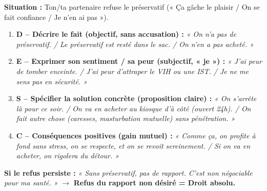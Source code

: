 \documentclass[11pt]{article}
\begin{document}
\begin{methode}
\textbf{Situation :} Ton/ta partenaire refuse le préservatif (« Ça gâche le plaisir / On se fait confiance / Je n'en ai pas »).
\begin{enumerate}
    \item \textbf{D -- Décrire le fait (objectif, sans accusation) :} \emph{« On n'a pas de préservatif. / Le préservatif est resté dans le sac. / On n'en a pas acheté. »}
    \item \textbf{E -- Exprimer son sentiment / sa peur (subjectif, « je ») :} \emph{« J'ai peur de tomber enceinte. / J'ai peur d'attraper le VIH ou une IST. / Je ne me sens pas en sécurité. »}
    \item \textbf{S -- Spécifier la solution concrète (proposition claire) :} \emph{« On s'arrête là pour ce soir. / On va en acheter au kiosque d'à côté (ouvert 24h). / On fait autre chose (caresses, masturbation mutuelle) sans pénétration. »}
    \item \textbf{C -- Conséquences positives (gain mutuel) :} \emph{« Comme ça, on profite à fond sans stress, on se respecte, et on se revoit sereinement. / Si on va en acheter, on rigolera du détour. »}
\end{enumerate}
\textbf{Si le refus persiste :} \emph{« Sans préservatif, pas de rapport. C'est non négociable pour ma santé. »} $\rightarrow$ \textbf{Refus du rapport non désiré = Droit absolu.}
\end{methode}
\end{document}
